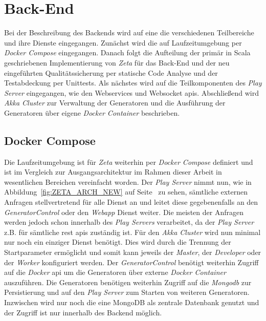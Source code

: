 \section{Back-End}

Bei der Beschreibung des Backends wird auf eine die verschiedenen Teilbereiche und ihre Dienste eingegangen. Zunächst wird die auf Laufzeitumgebung per \textit{Docker Compose} eingegangen. Danach folgt die Aufteilung der primär in Scala geschriebenen Implementierung von \textit{Zeta} für das Back-End und der neu eingeführten Qualitätssicherung per statische Code Analyse und der Testabdeckung per Unittests. Als nächstes wird auf die Teilkomponenten des \textit{Play Server} eingegangen, wie den Webservices und Websocket \acp{api}. Abschließend wird \textit{Akka Cluster} zur Verwaltung der Generatoren und die Ausführung der Generatoren über eigene \textit{Docker Container} beschrieben.

\subsection{Docker Compose}

Die Laufzeitumgebung ist für \textit{Zeta} weiterhin per \textit{Docker Compose} definiert und ist im Vergleich zur Ausgangsarchitektur im Rahmen dieser Arbeit in wesentlichen Bereichen vereinfacht worden. Der \textit{Play Server} nimmt nun, wie in Abbildung~\ref{fig:ZETA_ARCH_NEW} auf Seite~\pageref{fig:ZETA_ARCH_NEW} zu sehen, sämtliche externen Anfragen stellvertretend für alle Dienst an und leitet diese gegebenenfalls an den \textit{GeneratorControl} oder den \textit{Webapp} Dienst weiter. Die meisten der Anfragen werden jedoch schon innerhalb des \textit{Play Servers} verarbeitet, da der \textit{Play Server} z.B. für sämtliche \ac{rest} \acp{api} zuständig ist. Für den \textit{Akka Cluster} wird nun minimal nur noch ein einziger Dienst benötigt. Dies wird durch die Trennung der Startparameter ermöglicht und somit kann jeweils der \textit{Master}, der \textit{Developer} oder der \textit{Worker} konfiguriert werden. Der \textit{GeneratorControl} benötigt weiterhin Zugriff auf die \textit{Docker} \ac{api} um die Generatoren über externe \textit{Docker Container} auszuführen. Die Generatoren benötigen weiterhin Zugriff auf die \textit{Mongodb} zur Persistierung und auf den \textit{Play Server} zum Starten von weiteren Generatoren. Inzwischen wird nur noch die eine MongoDB als zentrale Datenbank genutzt und der Zugriff ist nur innerhalb des Backend möglich.

